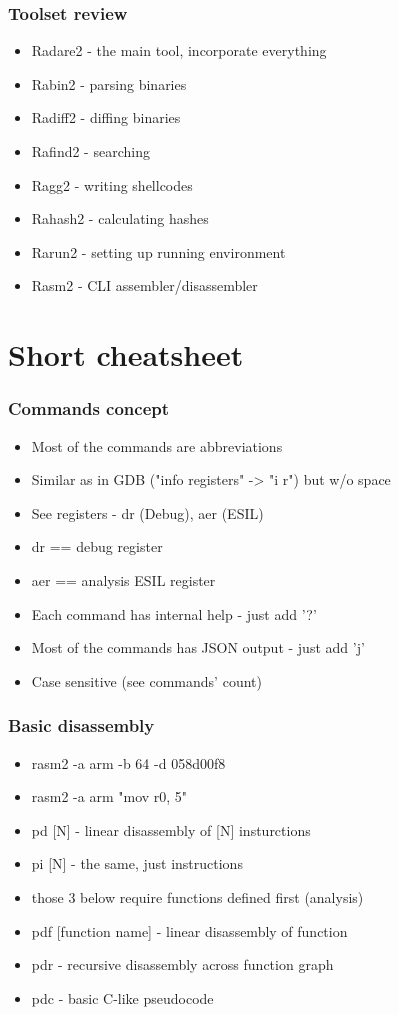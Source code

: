 \documentclass[10pt,pdf,utf8,english,compress,hyperref={unicode}]{beamer}
\begin{document}
\begin{frame}[fragile]
  \frametitle{Toolset review}
  \begin{itemize}
	\item Radare2 - the main tool, incorporate everything
	\item Rabin2 - parsing binaries
	\item Radiff2 - diffing binaries
	\item Rafind2 - searching
	\item Ragg2 - writing shellcodes
	\item Rahash2 - calculating hashes
	\item Rarun2 - setting up running environment
	\item Rasm2 - CLI assembler/disassembler
  \end{itemize}
\end{frame}

\section{Short cheatsheet}

\begin{frame}[fragile]
  \frametitle{Commands concept}
  \begin{itemize}
	  \item Most of the commands are abbreviations
	  \item Similar as in GDB ("info registers" -> "i r") but w/o space
	  \item See registers - dr (Debug), aer (ESIL)
	  \item dr == debug register
	  \item aer == analysis ESIL register
	  \item Each command has internal help - just add '?'
	  \item Most of the commands has JSON output - just add 'j'
	  \item Case sensitive (see commands' count)
  \end{itemize}
\end{frame}

\begin{frame}[fragile]
  \frametitle{Basic disassembly}
  \begin{itemize}
	  \item rasm2 -a arm -b 64 -d 058d00f8
	  \item rasm2 -a arm "mov r0, 5"
	  \item pd [N] - linear disassembly of [N] insturctions
	  \item pi [N] - the same, just instructions
	  \item those 3 below require functions defined first (analysis)
	  \item pdf [function name] - linear disassembly of function
	  \item pdr - recursive disassembly across function graph
	  \item pdc - basic C-like pseudocode
  \end{itemize}
\end{frame}
\end{document}
